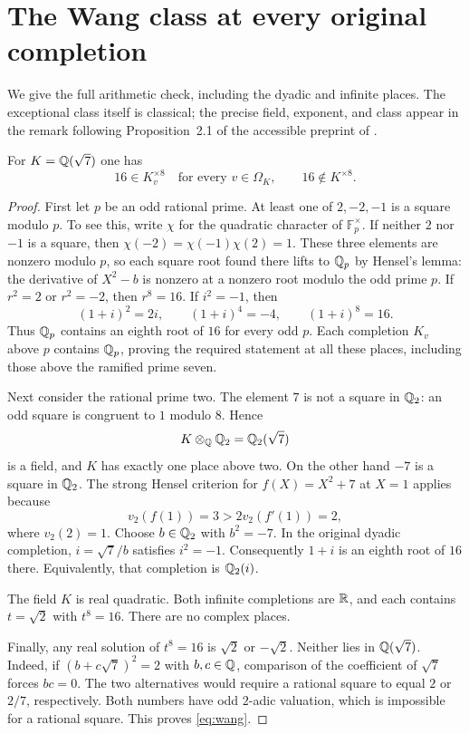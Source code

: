 \section{The Wang class at every original completion}\label{sec:places}

We give the full arithmetic check, including the dyadic and infinite
places. The exceptional class itself is classical; the precise field,
exponent, and class appear in the remark following Proposition~2.1
of the accessible preprint of \cite{wang2015grunwald}.

\begin{proposition}\label{prop:wang}
For $K=\mathbb Q(\sqrt7)$ one has
\begin{equation}\label{eq:wang}
  16\in K_v^{\times8}\quad\text{for every }v\in\Omega_K,
  \qquad 16\notin K^{\times8}.
\end{equation}
\end{proposition}

\begin{proof}
First let $p$ be an odd rational prime. At least one of
$2,-2,-1$ is a square modulo $p$.
To see this, write $\chi$ for the quadratic character of
$\mathbb F_p^\times$. If neither $2$ nor $-1$ is a square,
then $\chi(-2)=\chi(-1)\chi(2)=1$.
These three elements are nonzero modulo $p$, so each square
root found there lifts to $\mathbb Q_p$ by Hensel's lemma:
the derivative of $X^2-b$ is nonzero at a nonzero root modulo
the odd prime $p$.
If $r^2=2$ or $r^2=-2$, then $r^8=16$.
If $i^2=-1$, then
\[
  (1+i)^2=2i,\qquad (1+i)^4=-4,\qquad (1+i)^8=16.
\]
Thus $\mathbb Q_p$ contains an eighth root of $16$ for every odd $p$.
Each completion $K_v$ above $p$ contains $\mathbb Q_p$, proving the
required statement at all these places, including those above
the ramified prime seven.

Next consider the rational prime two. The element $7$ is not
a square in $\mathbb Q_2$: an odd square is congruent to $1$ modulo
$8$. Hence
\[
  K\otimes_\mathbb Q\mathbb Q_2=\mathbb Q_2(\sqrt7)
\]
is a field, and $K$ has exactly one place above two.
On the other hand $-7$ is a square in $\mathbb Q_2$. The strong Hensel
criterion for $f(X)=X^2+7$ at $X=1$ applies because
\[
  v_2(f(1))=3>2v_2(f'(1))=2,
\]
where $v_2(2)=1$.
Choose $b\in\mathbb Q_2$ with $b^2=-7$. In the original dyadic
completion, $i=\sqrt7/b$ satisfies $i^2=-1$.
Consequently $1+i$ is an eighth root of $16$ there.
Equivalently, that completion is $\mathbb Q_2(i)$.

The field $K$ is real quadratic. Both infinite completions
are $\mathbb R$, and each contains $t=\sqrt2$ with $t^8=16$.
There are no complex places.

Finally, any real solution of $t^8=16$ is $\sqrt2$ or $-\sqrt2$.
Neither lies in $\mathbb Q(\sqrt7)$.
Indeed, if $(b+c\sqrt7)^2=2$ with $b,c\in\mathbb Q$, comparison
of the coefficient of $\sqrt7$ forces $bc=0$.
The two alternatives would require a rational square to equal
$2$ or $2/7$, respectively. Both numbers have odd $2$-adic
valuation, which is impossible for a rational square.
This proves \eqref{eq:wang}.
\end{proof}

